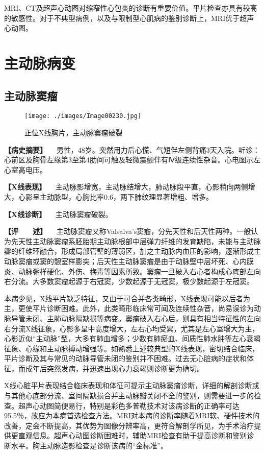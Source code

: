 MRI、CT及超声心动图对缩窄性心包炎的诊断有重要价值。平片检查亦具有较高的敏感性。对于不典型病例，以及与限制型心肌病的鉴别诊断上，MRI优于超声心动图。

\section{主动脉病变}

\subsection{主动脉窦瘤}

\begin{figure}[!htbp]
 \centering
 \texttt{[image: ./images/Image00230.jpg]}
 \captionsetup{justification=centering}
 \caption{正位X线胸片，主动脉窦瘤破裂}
 \label{fig4-9-1}
  \end{figure} 

\textbf{【病史摘要】}
　男性，48岁。突然用力后心慌、气短伴左侧背痛3天入院。听诊：心前区及胸骨左缘第3至第4肋间可触及轻微震颤伴有Ⅳ级连续性杂音。心电图示左心室高电压。

\textbf{【X线表现】}
　主动脉影增宽，主动脉结增大，肺动脉段平直，心影稍向两侧增大，心影呈主动脉型，心胸比率0.6，两下肺纹理显著增粗、增多。

\textbf{【X线诊断】} 　主动脉窦瘤破裂。

\textbf{【评　　述】}
　主动脉窦瘤又称Valsalva's窦瘤，分先天性和后天性两种。一般认为先天性主动脉窦瘤系胚胎期主动脉根部中层弹力纤维的发育缺陷，未能与主动脉瓣的纤维环融合，形成局部管壁的薄弱区，加之主动脉内血压的影响，逐渐形成主动脉窦瘤或窦的憩室样膨突；后天性主动脉窦瘤是由于动脉壁中层坏死、心内膜炎、动脉粥样硬化、外伤、梅毒等因素所致。窦瘤一旦破入右心者构成心底部左向右分流。大多数窦瘤起源于右冠窦，少数起源于无冠窦，极少数起源于左冠窦。

本病少见，X线平片缺乏特征，又由于可合并各类畸形，X线表现可能以后者为主，更使平片诊断困难。此外，此类畸形临床常可闻及连续性杂音，尚易误诊为动脉导管未闭、主肺动脉隔缺损等病变。窦瘤破入右心后，则具有相当特征性的左向右分流X线征象，心影多呈中高度增大，左右心均受累，尤其是左心室增大为主，心影近似“主动脉”型，大多有肺血增多；少数有肺瘀血、间质性肺水肿等左心衰竭征象、心缘和主动脉搏动增强等。如熟悉上述较典型的X线表现，密切结合临床，平片诊断及其与常见的动脉导管未闭的鉴别并不困难。过去无心脏病的症状和体征，而成年后突然发病，并迅速出现心力衰竭则诊断更为确切。

X线心脏平片表现结合临床表现和体征可提示主动脉窦瘤诊断，详细的解剖诊断或与其他心底部分流、室间隔缺损合并主动脉瓣关闭不全的鉴别，则需要进一步的检查。超声心动图简便易行，特别是彩色多普勒技术对该病诊断的正确率可达95.5％，故应为本病首选检查方法。MRI对本病的诊断率随着MRI软、硬件技术的改善，定会不断提高，其优势为图像分辨率高，更符合解剖学所见，为手术治疗提供更直观信息。超声心动图诊断困难时，辅助MRI检查有助于提高诊断和鉴别诊断水平。胸主动脉造影检查是诊断该病的“金标准”。

